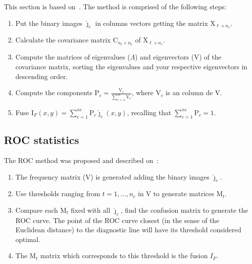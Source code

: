 \documentclass[journal]{IEEEtran}
\begin{document}
This section is based on~\cite{n_r,mit}.
The method is comprised of the following steps:
\begin{enumerate}
\item Put the binary images $\bm{\widehat\jmath}_c$ in columns vectors getting the matrix $\text{X}_{\ell\times n_c}$.
\item Calculate the covariance matrix $\text{C}_{n_c\times n_c}$ of $\text{X}_{\ell\times n_c}$.
\item Compute the matrices of eigenvalues ($\Lambda$) and eigenvectors (V) of the covariance matrix, sorting the eigenvalues and your respective eigenvectors in descending order. %
\item Compute the components $\text{P}_c=\frac{\text{V}_c}{\sum_{c=1}^{nc} \text{V}_c}$, where $\text{V}_c$ is an column de V. %
\item Fuse $\text{I}_F(x,y)=\sum_{c=1}^{nc}\text{P}_c\bm{\widehat\jmath}_c(x,y)$, recalling that $\sum_{c=1}^{nc}\text{P}_c=1$.
\end{enumerate}

\subsection{ROC statistics}
The ROC method was proposed and described on~\cite{gs,fawcett}:
\begin{enumerate}
\item The frequency matrix (V) is generated adding the binary images $\bm{\widehat\jmath}_c$.
\item Use thresholds ranging from $t=1,\dots,n_c$ in V to generate matrices $\text{M}_t$.
\item Compare each $\text{M}_t$ fixed with all $\bm{\widehat\jmath}_c$, find the confusion matrix to generate the ROC curve. The point of the ROC curve closest (in the sense of the Euclidean distance) to the diagnostic line will have its threshold considered optimal.
\item The $\text{M}_t$ matrix which corresponds to this threshold is the fusion $I_F$.
\end{enumerate}
\end{document}
